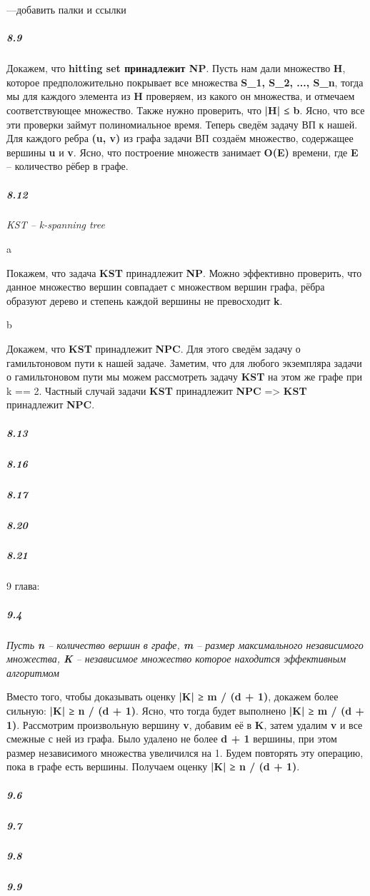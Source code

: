 \documentclass{article}
\begin{document}
---добавить палки и ссылки

\subparagraph{8.9}

Докажем, что \textbf{hitting set принадлежит NP}. Пусть нам дали множество \textbf{H}, которое предположительно покрывает все множества \textbf{S_1, S_2, ..., S_n}, тогда мы для каждого элемента из \textbf{H} проверяем, из какого он множества, и отмечаем соответствующее множество. Также нужно проверить, что \textbf{|H| ≤ b}. Ясно, что все эти проверки займут полиномиальное время. Теперь сведём задачу ВП к нашей. Для каждого ребра \textbf{(u, v)} из графа задачи ВП создаём множество, содержащее вершины \textbf{u} и \textbf{v}. Ясно, что построение множеств занимает \textbf{O(E)} времени, где \textbf{E} -- количество рёбер в графе.

\subparagraph{8.12}

\textit{KST -- k-spanning tree}

a

Покажем, что задача \textbf{KST} принадлежит \textbf{NP}. Можно эффективно проверить, что данное множество вершин совпадает с множеством вершин графа, рёбра образуют дерево и степень каждой вершины не превосходит \textbf{k}.

b

Докажем, что \textbf{KST} принадлежит \textbf{NPC}. Для этого сведём задачу о гамильтоновом пути к нашей задаче. Заметим, что для любого экземпляра задачи о гамильтоновом пути мы можем рассмотреть задачу \textbf{KST} на этом же графе при k == 2. Частный случай задачи \textbf{KST} принадлежит \textbf{NPC} => \textbf{KST} принадлежит \textbf{NPC}.

\subparagraph{8.13}

\subparagraph{8.16}

\subparagraph{8.17}

\subparagraph{8.20}

\subparagraph{8.21}

9 глава:

\subparagraph{9.4}

\textit{Пусть \textbf{n} -- количество вершин в графе, \textbf{m} -- размер максимального независимого множества, \textbf{K} -- независимое множество которое находится эффективным алгоритмом}

Вместо того, чтобы доказывать оценку \textbf{|K| ≥ m / (d + 1)}, докажем более сильную: \textbf{|K| ≥ n / (d + 1)}. Ясно, что тогда будет выполнено \textbf{|K| ≥ m / (d + 1)}. Рассмотрим произвольную вершину \textbf{v}, добавим её в \textbf{K}, затем удалим \textbf{v} и все смежные с ней из графа. Было удалено не более \textbf{d + 1} вершины, при этом размер независимого множества увеличился на 1. Будем повторять эту операцию, пока в графе есть вершины. Получаем оценку \textbf{|K| ≥ n / (d + 1)}.

\subparagraph{9.6}

\subparagraph{9.7}

\subparagraph{9.8}

\subparagraph{9.9}
\end{document}
